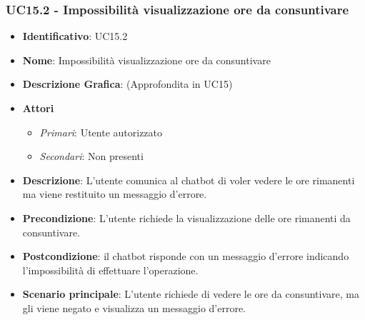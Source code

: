 \subsubsection{UC15.2 - Impossibilità visualizzazione ore da consuntivare}
\begin{itemize}
	\item \textbf{Identificativo}: UC15.2
	\item \textbf{Nome}: Impossibilità visualizzazione ore da consuntivare
	\item \textbf{Descrizione Grafica}: (Approfondita in UC15)
	\item \textbf{Attori}
	\begin{itemize} 
		\item \textit{Primari}: Utente autorizzato
		\item \textit{Secondari}: Non presenti
	\end{itemize}
	\item \textbf{Descrizione}: L'utente comunica al chatbot di voler vedere le ore rimanenti ma viene restituito un messaggio d'errore.
	\item \textbf{Precondizione}: L'utente richiede la visualizzazione delle ore rimanenti da consuntivare.
	\item \textbf{Postcondizione}: il chatbot risponde con un messaggio d'errore indicando l'impossibilità di effettuare l'operazione.
	\item \textbf{Scenario principale}: L'utente richiede di vedere le ore da consuntivare, ma gli viene negato e visualizza un messaggio d'errore.
\end{itemize}